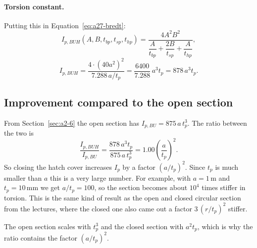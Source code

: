 \paragraph{Torsion constant.}
Putting this in Equation~\eqref{eq:a27-bredt}:
\begin{equation}
  I_{p,BUH}(A,B,t_{bp},t_{sp},t_{hp})
  = \frac{4A^2B^2}{\dfrac{A}{t_{bp}} + \dfrac{2B}{t_{sp}} + \dfrac{A}{t_{hp}}} ,
\end{equation}
\begin{equation}
  I_{p,BUH} = \frac{4\cdot(40a^2)^2}{7.288\,a/t_p}
            = \frac{6400}{7.288}\,a^3t_p = 878\,a^3t_p .
\end{equation}

\subsection{Improvement compared to the open section}

From Section~\ref{sec:a2-6} the open section has $I_{p,BU} = 875\,a\,t_p^3$.
The ratio between the two is
\begin{equation}
  \frac{I_{p,BUH}}{I_{p,BU}} = \frac{878\,a^3t_p}{875\,a\,t_p^3}
  = 1.00\left(\frac{a}{t_p}\right)^2 .
\end{equation}
So closing the hatch cover increases $I_p$ by a factor $(a/t_p)^2$. Since $t_p$ is much smaller than $a$ this is a very large number. For example, with $a = 1$\,m and $t_p = 10$\,mm we get $a/t_p = 100$, so the section becomes about $10^4$ times stiffer in torsion. This is the same kind of result as the open and closed circular section from the lectures, where the closed one also came out a factor $3\,(r/t_p)^2$ stiffer.

The open section scales with $t_p^3$ and the closed section with $a^2t_p$, which is why the ratio contains the factor $(a/t_p)^2$.

